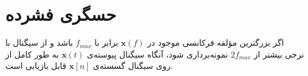 \begin{frame}
\tableofcontents
\end{frame}


\section{حسگری فشرده\hfill}
\begin{frame}

\begin{theorem}
اگر بزرگترين مؤلفه فرکانسی موجود در
$\bm{x}(f)$
برابر با 
$f_{max}$
باشد  و از سيگنال با نرخی بیشتر از 
$2f_{max}$
نمونه‌برداری شود، آنگاه سیگنال پیوسته‌ی
$\bm{x}(t)$
به طور کامل از روی سیگنال گسسته‌ی
$\bm{x}[n]$
قابل بازیابی است.
\end{theorem}
\pause
\begin{figure}
	\centering
	
\end{figure}
\end{frame}

